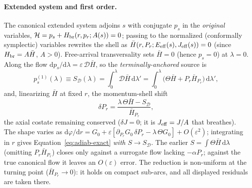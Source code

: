 \documentclass[12pt]{iopart}
\theoremstyle{plain}
\theoremstyle{definition}
\theoremstyle{remark}
\newcommand{\dd}{\mathrm{d}}
\begin{document}
\paragraph{Extended system and first order.} The canonical extended system adjoins $s$
with conjugate $p_s$ in the \emph{original} variables,
$\mathcal H=p_s+H_{\rm br}(r,p_r;A(s))=0$; passing to the normalized (conformally
symplectic) variables rewrites the shell as $\bar H(r,P_r;E_{\rm eff}(s),J_{\rm eff}(s))=0$
(since $H_{\rm br}=A\bar H$, $A>0$). Free-arrival transversality
sets $\bar H=0$ (hence $p_s=0$) at $\lambda=0$. Along the flow
$\dd p_s/\dd\lambda=\varepsilon\,\mathcal D\bar H$, so the \emph{terminally-anchored}
source is
\begin{equation}
    p_s^{(1)}(\lambda)\equiv S_{\mathcal D}(\lambda)
    =\int_0^{\lambda}\mathcal D\bar H\,\dd\lambda'
    =\int_0^{\lambda}\big(\Theta\bar H+P_r\bar H_{P_r}\big)\,\dd\lambda',
    \label{eq:pS-app}
\end{equation}
and, linearizing $\bar H$ at fixed $r$, the momentum-shell shift
\begin{equation}
    \delta P_r=\frac{\lambda\,\Theta\bar H-S_{\mathcal D}}{\bar H_{P_r}},
    \label{eq:dpr-app}
\end{equation}
the axial costate remaining conserved ($\delta J=0$; it is $J_{\rm eff}=J/A$ that
breathes). The shape varies as $\dd\varphi/\dd r=G_0+\varepsilon[\partial_{P_r}G_0\,\delta
P_r-\lambda\,\Theta G_0]+O(\varepsilon^2)$; integrating in $r$ gives
Equation~\eqref{eq:adiab-exact} \emph{with $S\to S_{\mathcal D}$}. The earlier $S=\int\Theta\bar
H\,\dd\lambda$ (omitting $P_r\bar H_{P_r}$) closes only against a surrogate flow lacking
$-\alpha P_r$; against the true canonical flow it leaves an $O(\varepsilon)$ error. The
reduction is non-uniform at the turning point ($\bar H_{P_r}\to0$): it holds on compact
sub-arcs, and all displayed residuals are taken there.
\end{document}
